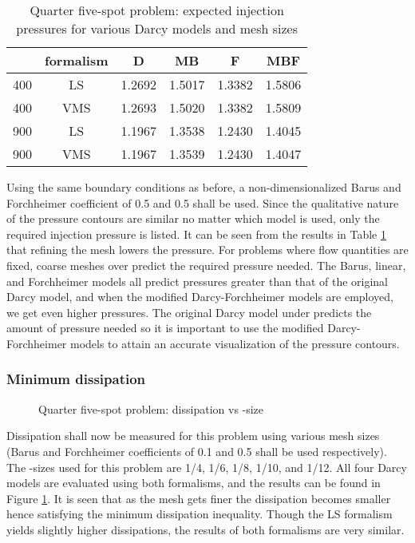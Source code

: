 \documentclass[11pt,reqno]{amsart}
\begin{document}
\begin{table}[h!]
  \centering
  \caption{Quarter five-spot problem: expected injection pressures for various Darcy 
  models and mesh sizes}
  \begin{tabular}{cc|cccc}
      \hline
       & formalism & D & MB & F & MBF \\
      \hline
      400 & LS & 1.2692 & 1.5017 & 1.3382 & 1.5806 \\
      400 & VMS & 1.2693 & 1.5020 & 1.3382 & 1.5809 \\
      900 & LS & 1.1967 & 1.3538 & 1.2430 & 1.4045 \\
      900 & VMS & 1.1967 & 1.3539 & 1.2430 & 1.4047 \\
      \hline
  \end{tabular}
  \label{Tab:quarter_spot_pvm}
\end{table}
Using the same boundary conditions as before, a non-dimensionalized Barus and 
Forchheimer coefficient of 0.5 and 0.5 shall be used. Since the qualitative nature of 
the pressure contours are similar no matter which model is used, only the required 
injection pressure is listed. It can be seen from the results in Table 
\ref{Tab:quarter_spot_pvm} that refining the mesh lowers the pressure. For problems where 
flow quantities are fixed, coarse meshes over predict the required pressure needed. 
The Barus, linear, and Forchheimer models all predict pressures greater than that of the 
original Darcy model, and when the modified Darcy-Forchheimer models are employed, 
we get even higher pressures. The original Darcy model under predicts the amount of 
pressure needed so it is important to use the modified Darcy-Forchheimer models to 
attain an accurate visualization of the pressure contours.

\subsubsection{Minimum dissipation}
\begin{figure}[t!]
  \centering
  \caption{Quarter five-spot problem: dissipation vs -size}
  \label{Fig:quarter_spot_dissipation}
\end{figure}
Dissipation shall now be measured for this problem using various mesh sizes (Barus and
Forchheimer coefficients of 0.1 and 0.5 shall be used respectively). The 
-sizes used for this problem are 1/4, 1/6, 1/8, 1/10, and 1/12. All four Darcy models are
evaluated using both formalisms, and the results can be found in Figure 
\ref{Fig:quarter_spot_dissipation}. It is seen that as the mesh gets finer the dissipation
becomes smaller hence satisfying the minimum dissipation inequality. Though the LS
formalism yields slightly higher dissipations, the results
of both formalisms are very similar.
\end{document}
